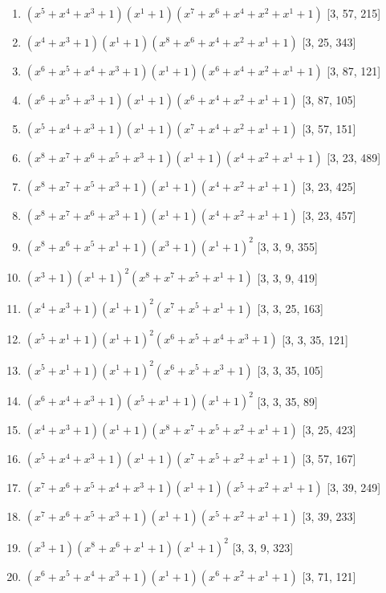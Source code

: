 \documentclass[10pt,twocolumn]{article}
\begin{document}
\begin{enumerate}
\item $(x^{5} + x^{4} + x^{3} + 1)(x^{1} + 1)(x^{7} + x^{6} + x^{4} + x^{2} + x^{1} + 1)$  [3, 57, 215]
\item $(x^{4} + x^{3} + 1)(x^{1} + 1)(x^{8} + x^{6} + x^{4} + x^{2} + x^{1} + 1)$  [3, 25, 343]
\item $(x^{6} + x^{5} + x^{4} + x^{3} + 1)(x^{1} + 1)(x^{6} + x^{4} + x^{2} + x^{1} + 1)$  [3, 87, 121]
\item $(x^{6} + x^{5} + x^{3} + 1)(x^{1} + 1)(x^{6} + x^{4} + x^{2} + x^{1} + 1)$  [3, 87, 105]
\item $(x^{5} + x^{4} + x^{3} + 1)(x^{1} + 1)(x^{7} + x^{4} + x^{2} + x^{1} + 1)$  [3, 57, 151]
\item $(x^{8} + x^{7} + x^{6} + x^{5} + x^{3} + 1)(x^{1} + 1)(x^{4} + x^{2} + x^{1} + 1)$  [3, 23, 489]
\item $(x^{8} + x^{7} + x^{5} + x^{3} + 1)(x^{1} + 1)(x^{4} + x^{2} + x^{1} + 1)$  [3, 23, 425]
\item $(x^{8} + x^{7} + x^{6} + x^{3} + 1)(x^{1} + 1)(x^{4} + x^{2} + x^{1} + 1)$  [3, 23, 457]
\item $(x^{8} + x^{6} + x^{5} + x^{1} + 1)(x^{3} + 1)(x^{1} + 1)^{2}$  [3, 3, 9, 355]
\item $(x^{3} + 1)(x^{1} + 1)^{2}(x^{8} + x^{7} + x^{5} + x^{1} + 1)$  [3, 3, 9, 419]
\item $(x^{4} + x^{3} + 1)(x^{1} + 1)^{2}(x^{7} + x^{5} + x^{1} + 1)$  [3, 3, 25, 163]
\item $(x^{5} + x^{1} + 1)(x^{1} + 1)^{2}(x^{6} + x^{5} + x^{4} + x^{3} + 1)$  [3, 3, 35, 121]
\item $(x^{5} + x^{1} + 1)(x^{1} + 1)^{2}(x^{6} + x^{5} + x^{3} + 1)$  [3, 3, 35, 105]
\item $(x^{6} + x^{4} + x^{3} + 1)(x^{5} + x^{1} + 1)(x^{1} + 1)^{2}$  [3, 3, 35, 89]
\item $(x^{4} + x^{3} + 1)(x^{1} + 1)(x^{8} + x^{7} + x^{5} + x^{2} + x^{1} + 1)$  [3, 25, 423]
\item $(x^{5} + x^{4} + x^{3} + 1)(x^{1} + 1)(x^{7} + x^{5} + x^{2} + x^{1} + 1)$  [3, 57, 167]
\item $(x^{7} + x^{6} + x^{5} + x^{4} + x^{3} + 1)(x^{1} + 1)(x^{5} + x^{2} + x^{1} + 1)$  [3, 39, 249]
\item $(x^{7} + x^{6} + x^{5} + x^{3} + 1)(x^{1} + 1)(x^{5} + x^{2} + x^{1} + 1)$  [3, 39, 233]
\item $(x^{3} + 1)(x^{8} + x^{6} + x^{1} + 1)(x^{1} + 1)^{2}$  [3, 3, 9, 323]
\item $(x^{6} + x^{5} + x^{4} + x^{3} + 1)(x^{1} + 1)(x^{6} + x^{2} + x^{1} + 1)$  [3, 71, 121]

\end{enumerate}
\end{document}
